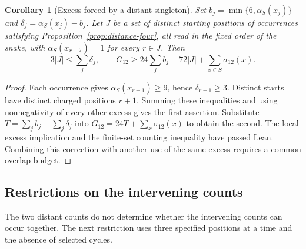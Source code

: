 \documentclass[11pt,a4paper]{article}
\newtheorem{corollary}[theorem]{Corollary}
\theoremstyle{definition}
\theoremstyle{remark}
\begin{document}
\begin{corollary}[Excess forced by a distant singleton]\label{cor:distance-four-excess}
Set $b_j=\min\{6,\alpha_S(x_j)\}$ and $\delta_j=\alpha_S(x_j)-b_j$. Let $J$ be a set of distinct starting positions of occurrences satisfying Proposition~\ref{prop:distance-four}, all read in the fixed order of the snake, with $\alpha_S(x_{r+7})=1$ for every $r\in J$. Then
\[
3|J|\le\sum_j\delta_j,\qquad
G_{12}\ge24\sum_j b_j+72|J|+\sum_{x\in S}\sigma_{12}(x).
\]
\end{corollary}
\begin{proof}
Each occurrence gives $\alpha_S(x_{r+1})\ge9$, hence $\delta_{r+1}\ge3$. Distinct starts have distinct charged positions $r+1$. Summing these inequalities and using nonnegativity of every other excess gives the first assertion. Substitute $T=\sum_j b_j+\sum_j\delta_j$ into $G_{12}=24T+\sum_x\sigma_{12}(x)$ to obtain the second. The local excess implication and the finite-set counting inequality have passed Lean. Combining this correction with another use of the same excess requires a common overlap budget.
\end{proof}


\subsection{Restrictions on the intervening counts}\label{sec:intervening-counts}
The two distant counts do not determine whether the intervening counts can occur together. The next restriction uses three specified positions at a time and the absence of selected cycles.
\end{document}
